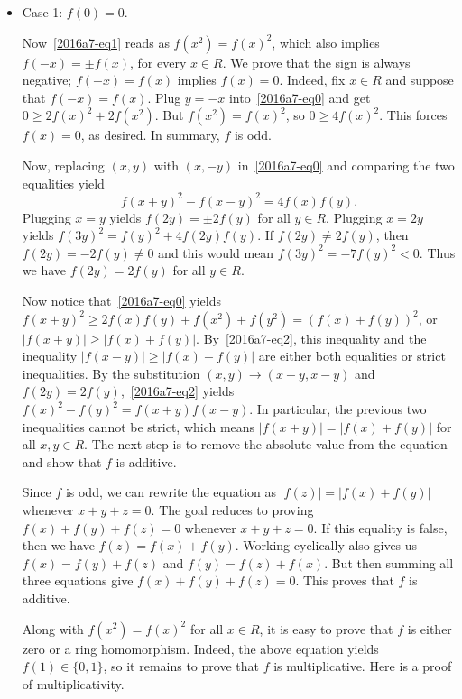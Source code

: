 \documentclass{article}
\begin{document}
\begin{itemize}



    \item
    Case 1: $f(0) = 0$.

    Now~\eqref{2016a7-eq1} reads as $f(x^2) = f(x)^2$, which also implies $f(-x) = \pm f(x)$, for every $x \in R$.
    We prove that the sign is always negative; $f(-x) = f(x)$ implies $f(x) = 0$.
    Indeed, fix $x \in R$ and suppose that $f(-x) = f(x)$.
    Plug $y = -x$ into~\eqref{2016a7-eq0} and get $0 \geq 2 f(x)^2 + 2 f(x^2)$.
    But $f(x^2) = f(x)^2$, so $0 \geq 4 f(x)^2$.
    This forces $f(x) = 0$, as desired.
    In summary, $f$ is odd.

    Now, replacing $(x, y)$ with $(x, -y)$ in~\eqref{2016a7-eq0} and comparing the two equalities yield
    \[ f(x + y)^2 - f(x - y)^2 = 4 f(x) f(y). \tag{2}\label{2016a7-eq2} \]
    Plugging $x = y$ yields $f(2y) = \pm 2 f(y)$ for all $y \in R$.
    Plugging $x = 2y$ yields $f(3y)^2 = f(y)^2 + 4 f(2y) f(y)$.
    If $f(2y) \neq 2 f(y)$, then $f(2y) = -2 f(y) \neq 0$ and this would mean $f(3y)^2 = -7 f(y)^2 < 0$.
    Thus we have $f(2y) = 2 f(y)$ for all $y \in R$.

    Now notice that~\eqref{2016a7-eq0} yields $f(x + y)^2 \geq 2 f(x) f(y) + f(x^2) + f(y^2) = (f(x) + f(y))^2$, or $|f(x + y)| \geq |f(x) + f(y)|$.
    By~\eqref{2016a7-eq2}, this inequality and the inequality $|f(x - y)| \geq |f(x) - f(y)|$ are either both equalities or strict inequalities.
    By the substitution $(x, y) \to (x + y, x - y)$ and $f(2y) = 2 f(y)$,~\eqref{2016a7-eq2} yields $f(x)^2 - f(y)^2 = f(x + y) f(x - y)$.
    In particular, the previous two inequalities cannot be strict, which means $|f(x + y)| = |f(x) + f(y)|$ for all $x, y \in R$.
    The next step is to remove the absolute value from the equation and show that $f$ is additive.

    Since $f$ is odd, we can rewrite the equation as $|f(z)| = |f(x) + f(y)|$ whenever $x + y + z = 0$.
    The goal reduces to proving $f(x) + f(y) + f(z) = 0$ whenever $x + y + z = 0$.
    If this equality is false, then we have $f(z) = f(x) + f(y)$.
    Working cyclically also gives us $f(x) = f(y) + f(z)$ and $f(y) = f(z) + f(x)$.
    But then summing all three equations give $f(x) + f(y) + f(z) = 0$.
    This proves that $f$ is additive.

    Along with $f(x^2) = f(x)^2$ for all $x \in R$, it is easy to prove that $f$ is either zero or a ring homomorphism.
    Indeed, the above equation yields $f(1) \in \{0, 1\}$, so it remains to prove that $f$ is multiplicative.
    Here is a proof of multiplicativity.


\end{itemize}
\end{document}
